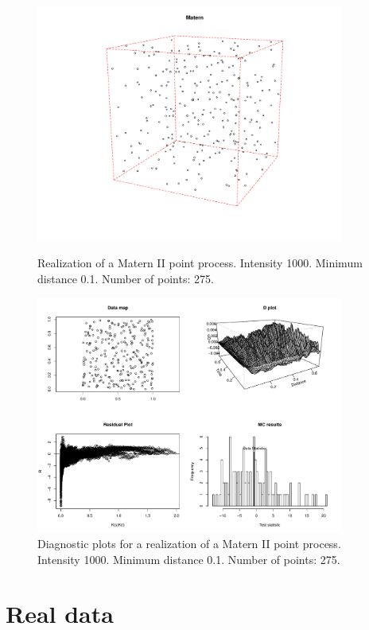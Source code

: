 \documentclass{article}
\begin{document}
\begin{figure}[p]
  \centering
    \includegraphics[width=0.9\textwidth]{PP_Matern_II_1000_0p1_275.pdf}
  \caption{Realization of a Matern II point process. Intensity 1000. Minimum distance 0.1. Number of points: 275.}
  \label{fig:matern2PP}

\vspace*{\floatsep}

    \includegraphics[width=0.9\textwidth]{diag_Matern_II_1000_0p1_275.pdf}
  \caption{Diagnostic plots for a realization of a Matern II point process.  Intensity 1000. Minimum distance 0.1. Number of points: 275.}
  \label{fig:matern2Diag}
\end{figure}





\section{Real data}
\end{document}
